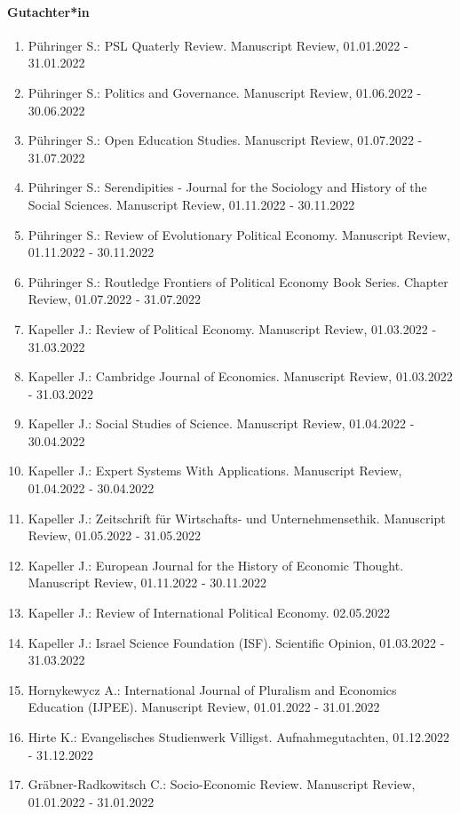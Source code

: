 \paragraph{Gutachter*in}
\begin{enumerate}[leftmargin=*, labelsep=0.5cm]
\item Pühringer S.: PSL Quaterly Review. Manuscript Review, 01.01.2022 - 31.01.2022
\item Pühringer S.: Politics and Governance. Manuscript Review, 01.06.2022 - 30.06.2022
\item Pühringer S.: Open Education Studies. Manuscript Review, 01.07.2022 - 31.07.2022
\item Pühringer S.: Serendipities - Journal for the Sociology and History of the Social Sciences. Manuscript Review, 01.11.2022 - 30.11.2022
\item Pühringer S.: Review of Evolutionary Political Economy. Manuscript Review, 01.11.2022 - 30.11.2022
\item Pühringer S.: Routledge Frontiers of Political Economy Book Series. Chapter Review, 01.07.2022 - 31.07.2022
\item Kapeller J.: Review of Political Economy. Manuscript Review, 01.03.2022 - 31.03.2022
\item Kapeller J.: Cambridge Journal of Economics. Manuscript Review, 01.03.2022 - 31.03.2022
\item Kapeller J.: Social Studies of Science. Manuscript Review, 01.04.2022 - 30.04.2022
\item Kapeller J.: Expert Systems With Applications. Manuscript Review, 01.04.2022 - 30.04.2022
\item Kapeller J.: Zeitschrift für Wirtschafts- und Unternehmensethik. Manuscript Review, 01.05.2022 - 31.05.2022
\item Kapeller J.: European Journal for the History of Economic Thought. Manuscript Review, 01.11.2022 - 30.11.2022
\item Kapeller J.: Review of International Political Economy. 02.05.2022
\item Kapeller J.: Israel Science Foundation (ISF). Scientific Opinion, 01.03.2022 - 31.03.2022
\item Hornykewycz A.: International Journal of Pluralism and Economics Education (IJPEE). Manuscript Review, 01.01.2022 - 31.01.2022
\item Hirte K.: Evangelisches Studienwerk Villigst. Aufnahmegutachten, 01.12.2022 - 31.12.2022
\item Gräbner-Radkowitsch C.: Socio-Economic Review. Manuscript Review, 01.01.2022 - 31.01.2022

\end{enumerate}
